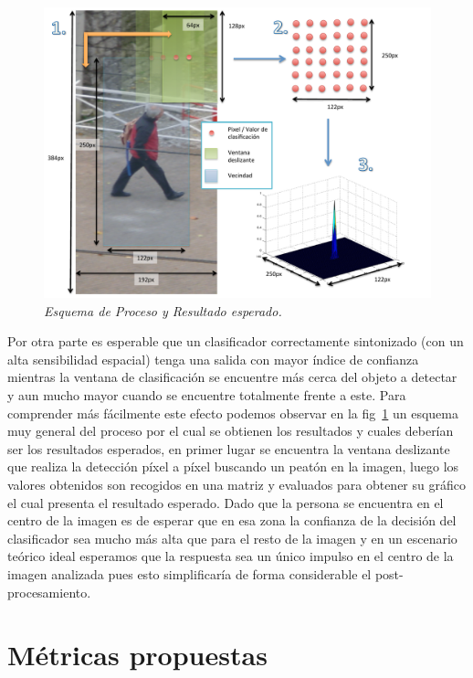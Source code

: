 \begin{figure}[tp]
  \centering
  \includegraphics[scale=.6]{images/expected}
  \caption{\em Esquema de Proceso y Resultado esperado.}  
  \label{fig:expected}
\end{figure}

Por otra parte es esperable que un clasificador correctamente sintonizado (con un alta sensibilidad espacial) tenga una salida con mayor índice de confianza mientras la ventana de clasificación se encuentre más cerca del objeto a detectar y aun mucho mayor cuando se encuentre totalmente frente a este. Para comprender más fácilmente este efecto podemos observar en la fig~\ref{fig:expected} un esquema muy general del proceso por el cual se obtienen los resultados y cuales deberían ser los resultados esperados, en primer lugar se encuentra la ventana deslizante que realiza la detección píxel a píxel buscando un peatón en la imagen, luego los valores obtenidos son recogidos en una matriz y evaluados para obtener su gráfico el cual presenta el resultado esperado. Dado que la persona se encuentra en el centro de la imagen es de esperar que en esa zona la confianza de la decisión del clasificador sea mucho más alta que para el resto de la imagen y en un escenario teórico ideal esperamos que la respuesta sea un único impulso en el centro de la imagen analizada pues esto simplificaría de forma considerable el post-procesamiento.


\section{M\'etricas propuestas}
\label{metricas:propuestas}

